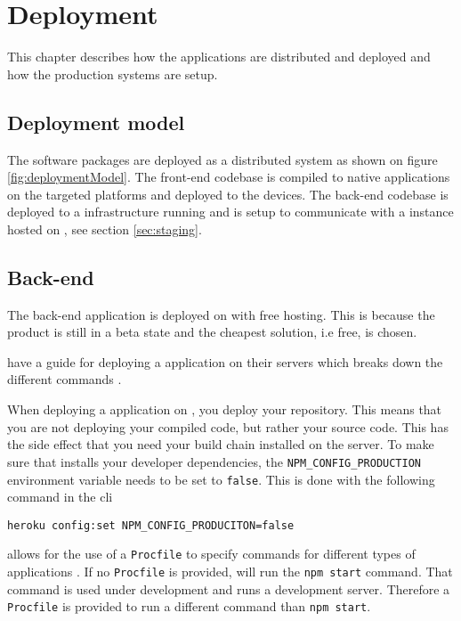 \chapter{Deployment}
This chapter describes how the applications are distributed and deployed and how the production systems are setup.

\section{Deployment model}
The software packages are deployed as a distributed system as shown on figure \ref{fig:deploymentModel}.
The front-end codebase is compiled to native applications on the targeted platforms and deployed to the devices.
The back-end codebase is deployed to a  infrastructure running  and is setup to communicate with a  instance hosted on , see section \ref{sec:staging}.


\section{Back-end}
The back-end application is deployed on  with free hosting. This is because the product is still in a beta state and the cheapest solution, i.e free, is chosen.

 have a guide for deploying a  application on their servers which breaks down the different commands \citep{documentation:deployment:heroku}.

When deploying a  application on , you deploy your  repository. 
This means that you are not deploying your compiled code, but rather your source code.
This has the side effect that you need your build chain installed on the  server.
To make sure that  installs your developer dependencies, the \verb+NPM_CONFIG_PRODUCTION+ environment variable needs to be set to \verb+false+.
This is done with the following command in the \gls{cli}

\verb+heroku config:set NPM_CONFIG_PRODUCITON=false+

 allows for the use of a \verb+Procfile+ to specify commands for different types of applications \citep{documentation:deployment:heroku:procfile}.
If no \verb+Procfile+ is provided,  will run the \verb+npm start+ command.
That command is used under development and runs a development server.
Therefore a \verb+Procfile+ is provided to run a different command than \verb+npm start+.

